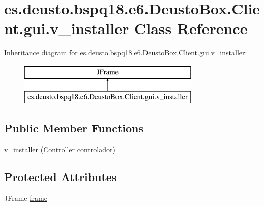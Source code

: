 \hypertarget{classes_1_1deusto_1_1bspq18_1_1e6_1_1_deusto_box_1_1_client_1_1gui_1_1v__installer}{}\section{es.\+deusto.\+bspq18.\+e6.\+Deusto\+Box.\+Client.\+gui.\+v\+\_\+installer Class Reference}
\label{classes_1_1deusto_1_1bspq18_1_1e6_1_1_deusto_box_1_1_client_1_1gui_1_1v__installer}
Inheritance diagram for es.\+deusto.\+bspq18.\+e6.\+Deusto\+Box.\+Client.\+gui.\+v\+\_\+installer\+:\begin{figure}[H]
\begin{center}
\leavevmode
\includegraphics[height=2.000000cm]{classes_1_1deusto_1_1bspq18_1_1e6_1_1_deusto_box_1_1_client_1_1gui_1_1v__installer}
\end{center}
\end{figure}
\subsection*{Public Member Functions}
\begin{DoxyCompactItemize}
\item 
\mbox{\hyperlink{classes_1_1deusto_1_1bspq18_1_1e6_1_1_deusto_box_1_1_client_1_1gui_1_1v__installer_ae71e54515f77a1a828256995dfb506b2}{v\+\_\+installer}} (\mbox{\hyperlink{classes_1_1deusto_1_1bspq18_1_1e6_1_1_deusto_box_1_1_client_1_1controller_1_1_controller}{Controller}} controlador)
\end{DoxyCompactItemize}
\subsection*{Protected Attributes}
\begin{DoxyCompactItemize}
\item 
J\+Frame \mbox{\hyperlink{classes_1_1deusto_1_1bspq18_1_1e6_1_1_deusto_box_1_1_client_1_1gui_1_1v__installer_a2ec43c684c855671f40cfa6ba775a362}{frame}}
\end{DoxyCompactItemize}


